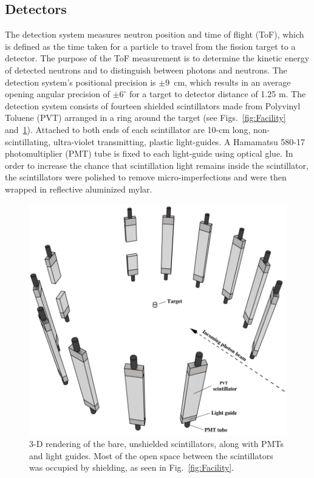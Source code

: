 \subsection{Detectors}
\label{subsection:detectors}
The detection system measures neutron position and time of flight (ToF), which is defined as the time taken for a particle to travel from the fission target to a detector.
The purpose of the ToF measurement is to determine the kinetic energy of detected neutrons and to distinguish between photons and neutrons.
The detection system's positional precision is $\pm$9~cm, which results in an average opening angular precision of $\pm6^{\circ}$ for a target to detector distance of 1.25 m. 
The detection system consists of fourteen shielded scintillators made from Polyvinyl Toluene (PVT) arranged in a ring around the target (see Figs.~\ref{fig:Facility} and~\ref{fig:DetGeom}).
Attached to both ends of each scintillator are 10-cm long, non-scintillating, ultra-violet transmitting, plastic light-guides.
A Hamamatsu 580-17 photomultiplier (PMT) tube is fixed to each light-guide using optical glue.
In order to increase the chance that scintillation light remains inside the scintillator, the scintillators were polished to remove micro-imperfections and were then wrapped in reflective aluminized mylar.
\begin{figure}[]
    \centering
    \includegraphics[width = \figsize\textwidth]{Detectors.png}
    \caption{3-D rendering of the bare, unshielded scintillators, along with PMTs and light guides.
    Most of the open space between the scintillators was occupied by shielding, as seen in Fig.~\ref{fig:Facility}.
    }
    \label{fig:DetGeom}
\end{figure}

